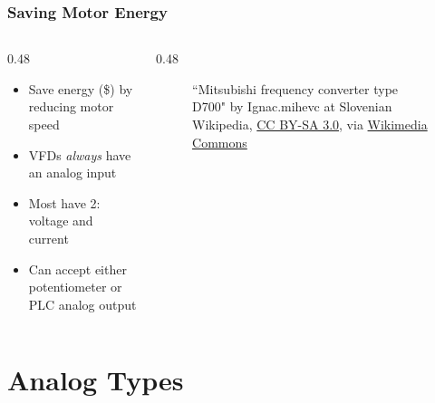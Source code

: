 \begin{frame}
    \frametitle{Saving Motor Energy}

    \begin{columns}
        \begin{column}{0.48\linewidth}
            \begin{itemize}
                \item Save energy (\$) by reducing motor speed
                \item VFDs \emph{always} have an analog input
                \item Most have 2: voltage and current
                \item Can accept either potentiometer or PLC analog output
            \end{itemize}
        \end{column}        
        \begin{column}{0.48\linewidth}
            \begin{figure}
                \centering

                {\tiny ``Mitsubishi frequency converter type D700" by Ignac.mihevc at Slovenian Wikipedia, \href{https://creativecommons.org/licenses/by-sa/3.0}{CC BY-SA 3.0}, via \href{https://commons.wikimedia.org/wiki/File:Mitsubishi_frekven\%C4\%8Dni_pretvornik.jpg}{Wikimedia Commons}\par}
            \end{figure}
        \end{column}
    \end{columns}
\end{frame}

\section{Analog Types}

